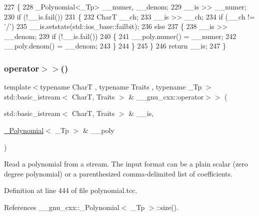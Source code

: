 \begin{DoxyCode}
227     \{
228       \_Polynomial<\_Tp> \_\_numer, \_\_denom;
229       \_\_is >> \_\_numer;
230       \textcolor{keywordflow}{if} (!\_\_is.fail())
231         \{
232           CharT \_\_ch;
233           \_\_is >> \_\_ch;
234           \textcolor{keywordflow}{if} (\_\_ch != \textcolor{charliteral}{'/'})
235             \_\_is.setstate(std::ios\_base::failbit);
236           \textcolor{keywordflow}{else}
237             \{
238               \_\_is >> \_\_denom;
239               \textcolor{keywordflow}{if} (!\_\_is.fail())
240                 \{
241                   \_\_poly.numer() = \_\_numer;
242                   \_\_poly.denom() = \_\_denom;
243                 \}
244             \}
245         \}
246       \textcolor{keywordflow}{return} \_\_is;
247     \}
\end{DoxyCode}
\mbox{\label{namespace____gnu__cxx_acf7d03318756578d08f672212cd91234}} 
\subsubsection{\texorpdfstring{operator$>$$>$()}{operator>>()}\hspace{0.1cm}{\footnotesize\ttfamily [2/2]}}
{\footnotesize\ttfamily template$<$typename CharT , typename Traits , typename \+\_\+\+Tp $>$ \\
std\+::basic\+\_\+istream$<$ CharT, Traits $>$ \& \+\_\+\+\_\+gnu\+\_\+cxx\+::operator$>$$>$ (\begin{DoxyParamCaption}\item[{std\+::basic\+\_\+istream$<$ CharT, Traits $>$ \&}]{\+\_\+\+\_\+is,  }\item[{\hyperlink{class____gnu__cxx_1_1__Polynomial}{\+\_\+\+Polynomial}$<$ \+\_\+\+Tp $>$ \&}]{\+\_\+\+\_\+poly }\end{DoxyParamCaption})}

Read a polynomial from a stream. The input format can be a plain scalar (zero degree polynomial) or a parenthesized comma-\/delimited list of coefficients. 

Definition at line 444 of file polynomial.\+tcc.



References \+\_\+\+\_\+gnu\+\_\+cxx\+::\+\_\+\+Polynomial$<$ \+\_\+\+Tp $>$\+::size().



